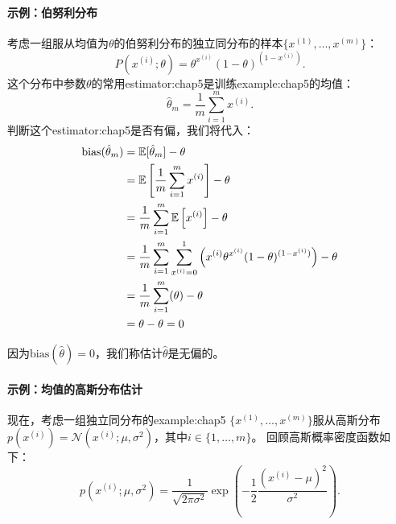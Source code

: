 
\paragraph{示例：伯努利分布}
考虑一组服从均值为$\theta$的伯努利分布的独立同分布的样本$\{x^{(1)}, \dots , x^{(m)}\}$：
\begin{equation}
    P(x^{(i)}; \theta) = \theta^{x^{(i)}} (1-\theta)^{(1 - x^{(i)})}.
\end{equation}
这个分布中参数$\theta$的常用\gls{estimator:chap5}是训练\gls{example:chap5}的均值：
\begin{equation}
\label{eq:5.22}
    \hat{\theta}_m = \frac{1}{m} \sum_{i=1}^m x^{(i)}.
\end{equation}
判断这个\gls{estimator:chap5}是否有偏，我们将代入：
\begin{align}
    \text{bias}(\hat{\theta}_m)     &= \mathbb{E}[\hat{\theta}_m] - \theta  \\
            &= \mathbb{E} \left[ \frac{1}{m} \sum_{i=1}^m x^{(i)} \right] - \theta \\
            &= \frac{1}{m} \sum_{i=1}^m \mathbb{E} \left[x^{(i)} \right] - \theta \\
            &= \frac{1}{m} \sum_{i=1}^m \sum_{x^{(i)} = 0}^1 \left( x^{(i)} \theta^{x^{(i)}} (1-\theta)^{(1-x^{(i)})} \right) - \theta \\
            &= \frac{1}{m} \sum_{i=1}^m (\theta) - \theta \\
            &= \theta - \theta = 0
\end{align}

因为$\text{bias}(\hat{\theta})=0$，我们称估计$\hat{\theta}$是无偏的。

\paragraph{示例：均值的高斯分布估计}
现在，考虑一组独立同分布的\gls{example:chap5} $\{x^{(1)}, \dots , x^{(m)}\}$服从高斯分布$p(x^{(i)}) = \mathcal{N}(x^{(i)}; \mu, \sigma^2)$，其中$i\in\{1, \dots, m\}$。
回顾高斯概率密度函数如下：
\begin{equation}
    p(x^{(i)}; \mu, \sigma^2) = \frac{1}{\sqrt{2\pi\sigma^2}} \exp\left( -\frac{1}{2} \frac{(x^{(i)} - \mu)^2}{\sigma^2}  \right).
\end{equation}

